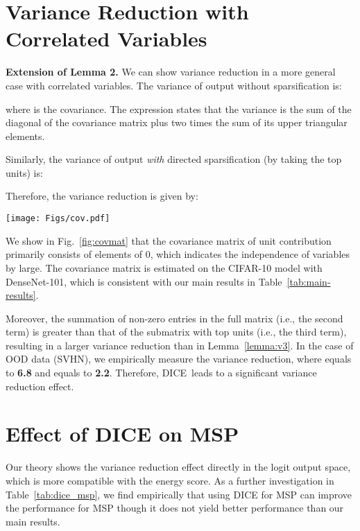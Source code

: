 \documentclass[runningheads]{llncs}
\newcommand{\methodAbbr}{DICE~}
\begin{document}
 

 
\section{Variance Reduction with Correlated Variables}
\label{sec:corr}

\noindent \textbf{Extension of Lemma 2.} We can show variance reduction in a more general case with correlated variables. The variance of output  without sparsification is:

where  is the covariance. The expression states that the variance is the sum of the diagonal of the covariance matrix plus two times the sum of its upper triangular elements.

Similarly, the variance of output \emph{with} directed sparsification (by taking the top units) is:

Therefore, the variance reduction is given by: 


\begin{figure*}[ht]
	\begin{center}
		\texttt{[image: Figs/cov.pdf]}
	\end{center}
	\caption{Covariance matrix of unit contribution estimated on the OOD dataset SVHN. Model is trained on ID dataset CIFAR-10. The unit indices are sorted from low to high, based on the expectation value of ID's unit contribution (airplane class, same as in Figure~\ref{fig:whytopk}). The matrix primarily consists of elements with 0 value. }
	\label{fig:covmat}
\end{figure*}



We show in Fig.~\ref{fig:covmat} that the covariance matrix of unit contribution  primarily consists of elements of 0, which indicates the independence of variables by large. The covariance matrix is estimated on the CIFAR-10 model with DenseNet-101, which is consistent with our main results in Table~\ref{tab:main-results}. 

Moreover, the summation of non-zero entries in the full matrix (i.e., the second term) is greater than that of the submatrix with top units (i.e., the third term), resulting in a larger variance reduction than in Lemma~\ref{lemma:v3}. In the case of OOD data (SVHN), we empirically measure the  variance reduction, where
 equals to \textbf{6.8} and  equals to \textbf{2.2}. Therefore, \methodAbbr leads to a significant variance reduction effect. 

\section{Effect of DICE on MSP}
\label{sec:dice_msp}
Our theory shows the variance reduction effect directly in the logit output space, which is more compatible with the energy score. As a further investigation in Table~\ref{tab:dice_msp}, we find empirically that using DICE for MSP can improve the performance for MSP though it does not yield better performance than our main results. 
\end{document}
